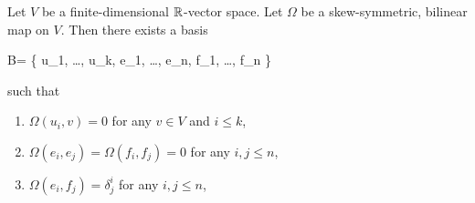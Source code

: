 \documentclass[main.tex]{subfiles}
\begin{document}
\begin{theorem}
\label{th:decomp_th}
	Let $V$ be a finite-dimensional $\mathbb{R}$-vector space. Let $\Omega$ be a skew-symmetric, bilinear map on $V$. Then there exists a basis
	\begin{eqalign}
		B= \{ u_1, \ldots, u_k, e_1, \ldots, e_n, f_1, \ldots, f_n \}
	\end{eqalign}
	such that
	\begin{enumerate}
		\item $\Omega(u_i, v) = 0$ for any $v \in V$ and $i \leq k$,
		\item $\Omega(e_i, e_j) = \Omega(f_i, f_j) = 0$ for any $i, j \leq n$,
		\item $\Omega(e_i, f_j) = \delta^i_j$ for any $i, j \leq n$,
	\end{enumerate}
\end{theorem}
\end{document}
